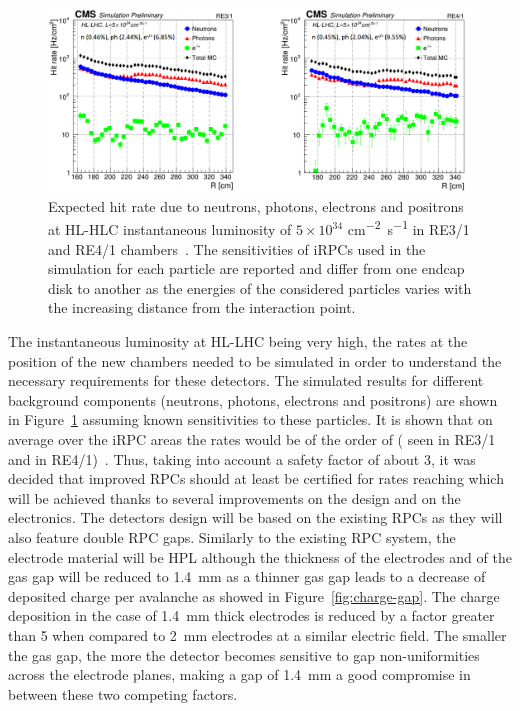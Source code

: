	\begin{figure}[H]
		\centering
		\includegraphics[width=\textwidth]{fig/chapt3/RPC-Sim-HL-LHC_Rate.png}
		\caption{\label{fig:iRPC-Rate} Expected hit rate due to neutrons, photons, electrons and positrons at HL-HLC instantaneous luminosity of $5\times10^{34}$ \si{cm^{-2}s^{-1}} in RE3/1 and RE4/1 chambers~\cite{ANDREA2018,ANDREA2018PROC}. The sensitivities of iRPCs used in the simulation for each particle are reported and differ from one endcap disk to another as the energies of the considered particles varies with the increasing distance from the interaction point.}
	\end{figure}
	
	The instantaneous luminosity at HL-LHC being very high, the rates at the position of the new chambers needed to be simulated in order to understand the necessary requirements for these detectors. The simulated results for different background components (neutrons, photons, electrons and positrons) are shown in Figure~\ref{fig:iRPC-Rate} assuming known sensitivities to these particles. It is shown that on average over the iRPC areas the rates would be of the order of  ( seen in RE3/1 and  in RE4/1)~\cite{ANDREA2018,ANDREA2018PROC}. Thus, taking into account a safety factor of about 3, it was decided that improved RPCs should at least be certified for rates reaching  which will be achieved thanks to several improvements on the design and on the electronics. The detectors design will be based on the existing RPCs as they will also feature double RPC gaps. Similarly to the existing RPC system, the electrode material will be HPL although the thickness of the electrodes and of the gas gap will be reduced to \SI{1.4}{mm} as a thinner gas gap leads to a decrease of deposited charge per avalanche as showed in Figure~\ref{fig:charge-gap}. The charge deposition in the case of \SI{1.4}{mm} thick electrodes is reduced by a factor greater than 5 when compared to \SI{2}{mm} electrodes at a similar electric field. The smaller the gas gap, the more the detector becomes sensitive to gap non-uniformities across the electrode planes, making a gap of \SI{1.4}{mm} a good compromise in between these two competing factors.

